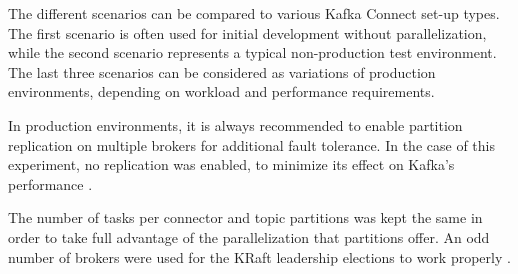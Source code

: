The different scenarios can be compared to various Kafka Connect set-up types. The first scenario is often used for initial development without parallelization, while the second scenario represents a typical non-production test environment. The last three scenarios can be considered as variations of production environments, depending on workload and performance requirements. %

In production environments, it is always recommended to enable partition replication on multiple brokers for additional fault tolerance. In the case of this experiment, no replication was enabled, to minimize its effect on Kafka's performance \cite{dobbelaerekafkavsrabbitmq}.

The number of tasks per connector and topic partitions was kept the same in order to take full advantage of the parallelization that partitions offer. An odd number of brokers were used for the KRaft leadership elections to work properly \cite{kraftconfluentdocumentation}.



